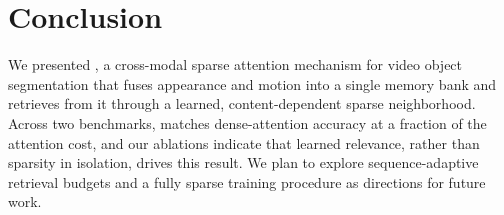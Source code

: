 \section{Conclusion}
We presented \methodname{}, a cross-modal sparse attention mechanism for video object segmentation that fuses appearance and motion into a single memory bank and retrieves from it through a learned, content-dependent sparse neighborhood. Across two benchmarks, \methodname{} matches dense-attention accuracy at a fraction of the attention cost, and our ablations indicate that learned relevance, rather than sparsity in isolation, drives this result. We plan to explore sequence-adaptive retrieval budgets and a fully sparse training procedure as directions for future work.

